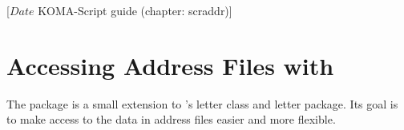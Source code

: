 %
%
%
%
%
%
%
%
% 
%
%
%
%

                 [$Date$
                  KOMA-Script guide (chapter: scraddr)]


\chapter{Accessing Address Files with }%
%
\BeginIndexGroup
{}

The  package is a small extension to \KOMAScript{}'s letter
class and letter package. Its goal is to make access to the data in address
files easier and more flexible.

